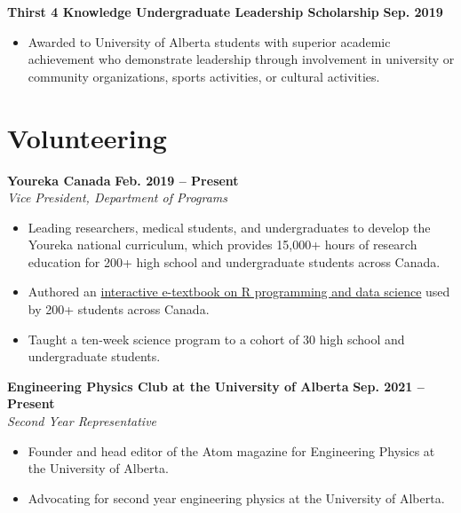 \documentclass{article}
\begin{document}
\textbf{Thirst 4 Knowledge Undergraduate Leadership Scholarship} \hfill \textbf{Sep. 2019}
\begin{itemize}
    \item Awarded to University of Alberta students with superior academic achievement who demonstrate leadership through involvement in university or community organizations, sports activities, or cultural activities.
\end{itemize}


\section*{\textcolor{my_colour}{Volunteering}}
\vspace{-.25em} \hrulefill \vspace{.25em}

\textbf{Youreka Canada} \hfill \textbf{Feb. 2019 -- Present} \\
\textit{Vice President, Department of Programs}
\begin{itemize}
    \item Leading researchers, medical students, and undergraduates to develop the Youreka national curriculum, which provides 15,000+ hours of research education for 200+ high school and undergraduate students across Canada.
    \item Authored an \href{https://youreka-textbook.netlify.app/}{interactive e-textbook on R programming and data science} used by 200+ students across Canada.
    \item Taught a ten-week science program to a cohort of 30 high school and undergraduate students.
\end{itemize} \vspace{1em}

\textbf{Engineering Physics Club at the University of Alberta} \hfill \textbf{Sep. 2021 -- Present} \\
\textit{Second Year Representative}
\begin{itemize}
    \item Founder and head editor of the Atom magazine for Engineering Physics at the University of Alberta.
    \item Advocating for second year engineering physics at the University of Alberta.
\end{itemize} \vspace{1em}
\end{document}
